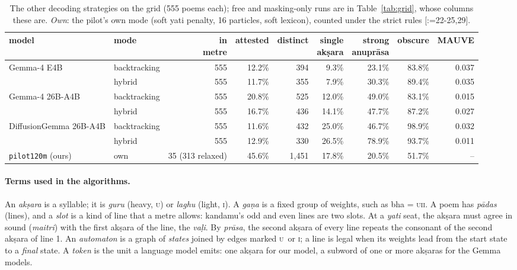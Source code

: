 \documentclass[11pt]{article}
\makeatletter
\newcommand{\U}{\textsc{u}}
\newcommand{\I}{\textsc{i}}
\DeclareRobustCommand{\exref}[1]{{\scriptsize[\def\ex@sep{}\@for\ex@i:=#1\do{\ex@sep
  \expandafter\ex@item\expandafter{\ex@i}\def\ex@sep{, }}]}}
\newcommand{\ex@item}[1]{\in@{-}{#1}\ifin@\ex@range#1\@nil\else\ex@link{#1}\fi}
\def\ex@range#1-#2\@nil{\ex@link{#1}--\ex@link{#2}}
\newcommand{\ex@link}[1]{\hyperref[exp:E#1]{E#1}}
\makeatother
\begin{document}
\begin{table}[!t]
\centering\scriptsize
\begin{tabular}{@{}llrrrrrrr@{}}
\toprule
model & mode & \thead[r]{in\\metre} & attested & distinct & \thead[r]{single\\akṣara} & \thead[r]{strong\\anuprāsa} & obscure & MAUVE \\
\midrule
Gemma-4 E4B & backtracking & 555 & 12.2\% & 394 & 9.3\% & 23.1\% & 83.8\% & 0.037 \\
 & hybrid & 555 & 11.7\% & 355 & 7.9\% & 30.3\% & 89.4\% & 0.035 \\
Gemma-4 26B-A4B & backtracking & 555 & 20.8\% & 525 & 12.0\% & 49.0\% & 83.1\% & 0.015 \\
 & hybrid & 555 & 16.7\% & 436 & 14.1\% & 47.7\% & 87.2\% & 0.027 \\
DiffusionGemma 26B-A4B & backtracking & 555 & 11.6\% & 432 & 25.0\% & 46.7\% & 98.9\% & 0.032 \\
 & hybrid & 555 & 12.9\% & 330 & 26.5\% & 78.9\% & 93.7\% & 0.011 \\
\texttt{pilot120m} (ours) & own & 35 (313 relaxed) & 45.6\% & 1,451 & 17.8\% & 20.5\% & 51.7\% & -- \\
\bottomrule
\end{tabular}
\caption{The other decoding strategies on the grid (555 poems each); free and masking-only runs are in
Table~\ref{tab:grid}, whose columns these are. \textit{Own}: the pilot's own mode (soft yati penalty, 16
particles, soft lexicon), counted under the strict rules \exref{22-25,29}.}
\label{tab:fullgrid}
\end{table}



\paragraph{Terms used in the algorithms.} An \emph{akṣara} is a syllable; it is \emph{guru} (heavy, \U) or
\emph{laghu} (light, \I). A \emph{gaṇa} is a fixed group of weights, such as bha = \U\I\I. A poem has
\emph{pādas} (lines), and a \emph{slot} is a kind of line that a metre allows: kandamu's odd and even lines are
two slots. At a \emph{yati} seat, the akṣara must agree in sound (\emph{maitri}) with the first akṣara of the
line, the \emph{vaḷi}. By \emph{prāsa}, the second akṣara of every line repeats the consonant of the second
akṣara of line 1. An \emph{automaton} is a graph of \emph{states} joined by edges marked \U\ or \I; a line is
legal when its weights lead from the start state to a \emph{final} state. A \emph{token} is the unit a
language model emits: one akṣara for our model, a subword of one or more akṣaras for the Gemma models.
\end{document}
